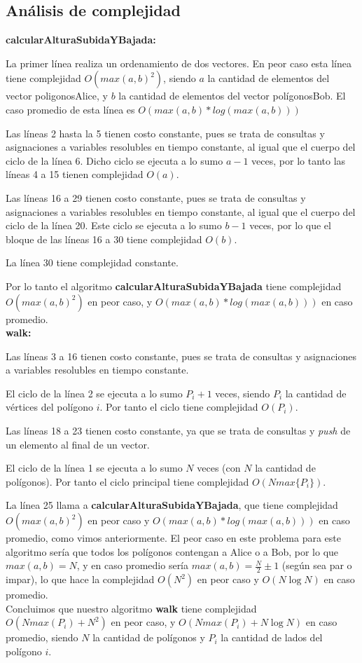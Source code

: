 \subsection*{Análisis de complejidad}

\textbf{calcularAlturaSubidaYBajada:}

La primer línea realiza un ordenamiento de dos vectores. En peor caso esta línea tiene complejidad
$O(max(a,b)^2)$, siendo $a$ la cantidad de elementos del vector poligonosAlice, y $b$ la cantidad de
elementos del vector polígonosBob. El caso promedio de esta línea es $O(max(a,b)*log(max(a,b)))$

Las líneas 2 hasta la 5 tienen costo constante, pues se trata de consultas y asignaciones a variables
resolubles en tiempo constante, al igual que el cuerpo del ciclo de la línea 6.
Dicho ciclo se ejecuta a lo sumo $a-1$ veces, por lo tanto las líneas 4 a 15 tienen
complejidad $O(a)$.

Las líneas 16 a 29 tienen costo constante, pues se trata de consultas y asignaciones a variables
resolubles en tiempo constante, al igual que el cuerpo del ciclo de la línea 20. Este ciclo
se ejecuta a lo sumo $b-1$ veces, por lo que el bloque de las líneas 16 a 30 tiene complejidad $O(b)$.

La línea 30 tiene complejidad constante.

Por lo tanto el algoritmo {\bf calcularAlturaSubidaYBajada} tiene complejidad
$O(max(a,b)^2)$ en peor caso, y $O(max(a,b)*log(max(a,b)))$ en caso promedio.\\


\textbf{walk:}

Las líneas 3 a 16 tienen costo constante, pues se trata de consultas y
asignaciones a variables resolubles en tiempo constante.

El ciclo de la línea 2 se ejecuta a lo sumo $P_i+1$ veces, siendo $P_i$ la
cantidad de vértices del polígono $i$. Por tanto el ciclo tiene complejidad $O(P_i)$.

Las líneas 18 a 23 tienen costo constante, ya que se trata de consultas y
{\sl push} de un elemento al final de un vector.

El ciclo de la línea 1 se ejecuta a lo sumo $N$ veces (con $N$ la cantidad de polígonos).
Por tanto el ciclo principal tiene complejidad $O(Nmax\{P_i\})$.

La línea 25 llama a {\bf calcularAlturaSubidaYBajada}, que tiene complejidad
$O(max(a,b)^2)$ en peor caso y $O(max(a,b)*log(max(a,b)))$ en caso promedio,
como vimos anteriormente. El peor caso en este problema para este algoritmo
sería que todos los polígonos contengan a Alice o a Bob, por lo que $max(a,b)
= N$, y en caso promedio sería $max(a,b) = \frac{N}{2}\pm 1$ (según sea par o impar),
lo que hace la complejidad $O(N^2)$ en peor caso y $O(N\log N)$ en caso
promedio.\\

Concluimos que nuestro algoritmo {\bf walk} tiene complejidad $O(Nmax(P_i)+N^2)$ en peor caso,
y $O(Nmax(P_i) + N\log N)$ en caso promedio, siendo $N$ la cantidad de polígonos y
$P_i$ la cantidad de lados del polígono $i$.
